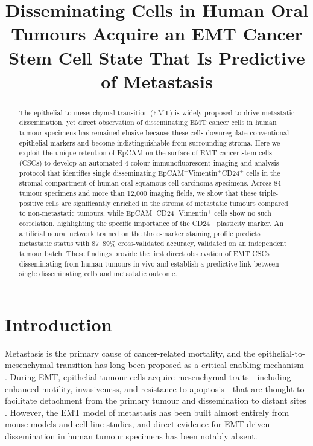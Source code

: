 \documentclass[11pt]{article}
\title{Disseminating Cells in Human Oral Tumours Acquire an EMT Cancer Stem Cell State That Is Predictive of Metastasis}
\author{}
\date{}
\begin{document}
\maketitle

\begin{abstract}
The epithelial-to-mesenchymal transition (EMT) is widely proposed to drive metastatic dissemination, yet direct observation of disseminating EMT cancer cells in human tumour specimens has remained elusive because these cells downregulate conventional epithelial markers and become indistinguishable from surrounding stroma. Here we exploit the unique retention of EpCAM on the surface of EMT cancer stem cells (CSCs) to develop an automated 4-colour immunofluorescent imaging and analysis protocol that identifies single disseminating EpCAM$^{+}$Vimentin$^{+}$CD24$^{+}$ cells in the stromal compartment of human oral squamous cell carcinoma specimens. Across 84 tumour specimens and more than 12,000 imaging fields, we show that these triple-positive cells are significantly enriched in the stroma of metastatic tumours compared to non-metastatic tumours, while EpCAM$^{+}$CD24$^{-}$Vimentin$^{+}$ cells show no such correlation, highlighting the specific importance of the CD24$^{+}$ plasticity marker. An artificial neural network trained on the three-marker staining profile predicts metastatic status with 87--89\% cross-validated accuracy, validated on an independent tumour batch. These findings provide the first direct observation of EMT CSCs disseminating from human tumours in vivo and establish a predictive link between single disseminating cells and metastatic outcome.
\end{abstract}

\section{Introduction}

Metastasis is the primary cause of cancer-related mortality, and the epithelial-to-mesenchymal transition has long been proposed as a critical enabling mechanism \citep{thiery2002epithelial,nieto2016emt}. During EMT, epithelial tumour cells acquire mesenchymal traits---including enhanced motility, invasiveness, and resistance to apoptosis---that are thought to facilitate detachment from the primary tumour and dissemination to distant sites \citep{yang2004twist,mani2008mesenchymal}. However, the EMT model of metastasis has been built almost entirely from mouse models and cell line studies, and direct evidence for EMT-driven dissemination in human tumour specimens has been notably absent.
\end{document}
